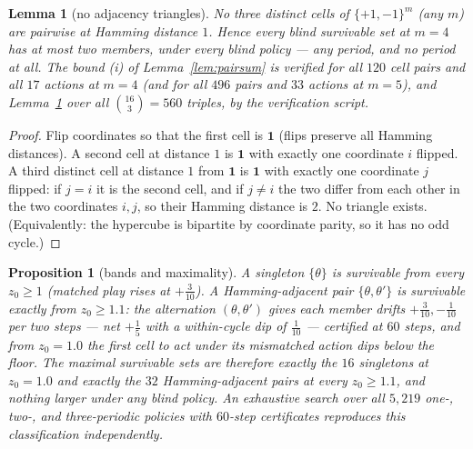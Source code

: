 \documentclass[10pt,twocolumn]{article}
\theoremstyle{plain}
\newtheorem{proposition}[theorem]{Proposition}
\newtheorem{lemma}[theorem]{Lemma}
\theoremstyle{definition}
\theoremstyle{remark}
\begin{document}
\begin{lemma}[no adjacency triangles]\label{lem:triangle}
No three distinct cells of \(\{+1,-1\}^{m}\) (any \(m\)) are
pairwise at Hamming distance \(1\). Hence every blind survivable set
at \(m = 4\) has at most two members, under every blind policy ---
any period, and no period at all. The bound (i) of
Lemma~\ref{lem:pairsum} is verified for all \(120\) cell pairs and
all \(17\) actions at \(m = 4\) (and for all \(496\) pairs and
\(33\) actions at \(m = 5\)), and
Lemma~\ref{lem:triangle} over all \(\binom{16}{3} = 560\) triples, by the verification script.
\end{lemma}

\begin{proof}
Flip coordinates so that the first cell is \(\mathbf{1}\) (flips
preserve all Hamming distances). A second cell at distance \(1\) is
\(\mathbf{1}\) with exactly one coordinate \(i\) flipped. A third
distinct cell at distance \(1\) from \(\mathbf{1}\) is
\(\mathbf{1}\) with exactly one coordinate \(j\) flipped: if
\(j = i\) it is the second cell, and if \(j \neq i\) the two differ
from each other in the two coordinates \(i, j\), so their Hamming
distance is \(2\). No triangle exists. (Equivalently: the hypercube
is bipartite by coordinate parity, so it has no odd cycle.)
\end{proof}

\begin{proposition}[bands and maximality]\label{prop:bands}
A singleton \(\{\theta\}\) is survivable from every \(z_{0} \ge 1\)
(matched play rises at \(+\tfrac3{10}\)). A Hamming-adjacent pair
\(\{\theta, \theta'\}\) is survivable exactly from
\(z_{0} \ge 1.1\): the alternation \((\theta, \theta')\) gives each
member drifts \(+\tfrac3{10}, -\tfrac1{10}\) per two steps --- net
\(+\tfrac15\) with a within-cycle dip of \(\tfrac1{10}\) --- certified
at \(60\) steps, and from \(z_{0} = 1.0\) the first cell to act under
its mismatched action dips below the floor. The maximal survivable
sets are therefore exactly the \(16\) singletons at \(z_{0} = 1.0\)
and exactly the \(32\) Hamming-adjacent pairs at every
\(z_{0} \ge 1.1\), and nothing larger under any blind policy. An
exhaustive search over all \(5{,}219\) one-, two-, and three-periodic
policies with \(60\)-step certificates reproduces this classification
independently.
\end{proposition}
\end{document}

